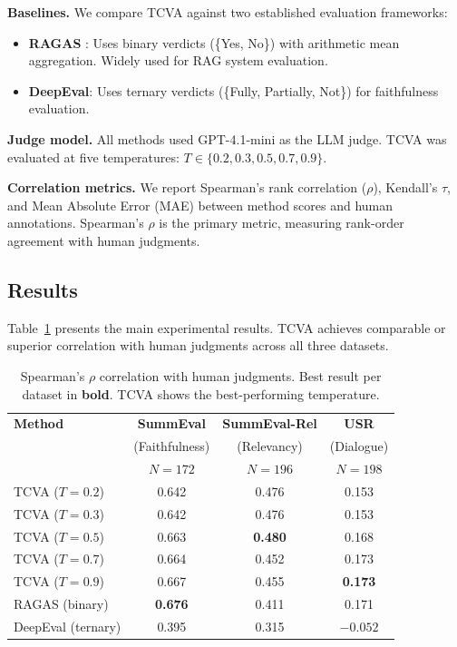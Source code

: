 \documentclass[sn-basic]{sn-jnl}
\theoremstyle{thmstyleone}%
\theoremstyle{thmstyletwo}%
\theoremstyle{thmstylethree}%
\begin{document}
\textbf{Baselines.} We compare TCVA against two established evaluation frameworks:
\begin{itemize}
\item \textbf{RAGAS} \cite{Es2023}: Uses binary verdicts (\{Yes, No\}) with arithmetic mean aggregation. Widely used for RAG system evaluation.
\item \textbf{DeepEval}: Uses ternary verdicts (\{Fully, Partially, Not\}) for faithfulness evaluation.
\end{itemize}

\textbf{Judge model.} All methods used GPT-4.1-mini as the LLM judge. TCVA was evaluated at five temperatures: $T \in \{0.2, 0.3, 0.5, 0.7, 0.9\}$.

\textbf{Correlation metrics.} We report Spearman's rank correlation ($\rho$), Kendall's $\tau$, and Mean Absolute Error (MAE) between method scores and human annotations. Spearman's $\rho$ is the primary metric, measuring rank-order agreement with human judgments.

\subsection{Results}

Table~\ref{tab:main-results} presents the main experimental results. TCVA achieves comparable or superior correlation with human judgments across all three datasets.

\begin{table}[h]
\caption{Spearman's $\rho$ correlation with human judgments. Best result per dataset in \textbf{bold}. TCVA shows the best-performing temperature.}
\label{tab:main-results}
\centering
\begin{tabular}{@{}lccc@{}}
\toprule
\textbf{Method} & \textbf{SummEval} & \textbf{SummEval-Rel} & \textbf{USR} \\
& (Faithfulness) & (Relevancy) & (Dialogue) \\
& $N=172$ & $N=196$ & $N=198$ \\
\midrule
TCVA ($T=0.2$) & 0.642 & 0.476 & 0.153 \\
TCVA ($T=0.3$) & 0.642 & 0.476 & 0.153 \\
TCVA ($T=0.5$) & 0.663 & \textbf{0.480} & 0.168 \\
TCVA ($T=0.7$) & 0.664 & 0.452 & 0.173 \\
TCVA ($T=0.9$) & 0.667 & 0.455 & \textbf{0.173} \\
\midrule
RAGAS (binary) & \textbf{0.676} & 0.411 & 0.171 \\
DeepEval (ternary) & 0.395 & 0.315 & $-0.052$ \\
\bottomrule
\end{tabular}
\end{table}
\end{document}

